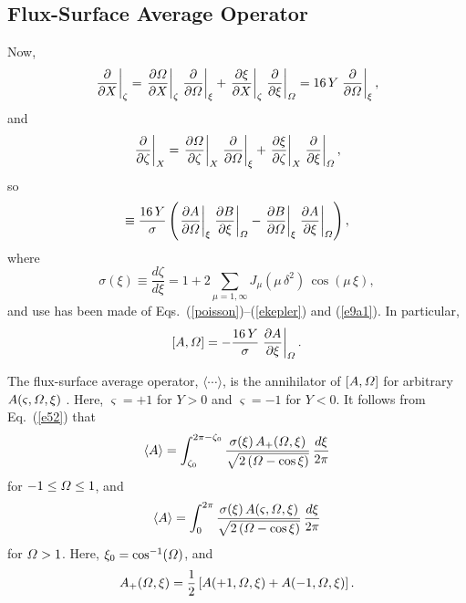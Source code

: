 \documentclass{iopjournal}
\begin{document}
\subsection{Flux-Surface Average Operator}
Now, 
\begin{equation}\label{e49}
\left.\frac{\partial}{\partial X}\right|_\zeta= \left.\frac{\partial{\mit\Omega}}{\partial X}\right|_\zeta\left.\frac{\partial}{\partial{\mit\Omega}}\right|_{\xi}+ \left.\frac{\partial\xi}{\partial X}\right|_\zeta\left.\frac{\partial}{\partial\xi}\right|_{\mit\Omega}=16\,Y\left.\frac{\partial}{\partial{\mit\Omega}}\right|_{\xi},
\end{equation}
and
\begin{equation}
\left.\frac{\partial}{\partial \zeta}\right|_X= \left.\frac{\partial{\mit\Omega}}{\partial \zeta}\right|_X\left.\frac{\partial}{\partial{\mit\Omega}}\right|_{\xi}+ \left.\frac{\partial\xi}{\partial \zeta}\right|_X\left.\frac{\partial}{\partial\xi}\right|_{\mit\Omega},
\end{equation}
so
\begin{equation}
[A,B] \equiv \frac{16\,Y}{\sigma}\left(\left.\frac{\partial A}{\partial{\mit\Omega}}\right|_\xi\left.\frac{\partial B}{\partial\xi}\right|_{\mit\Omega}-\left.\frac{\partial B}{\partial{\mit\Omega}}\right|_\xi\left.\frac{\partial A}{\partial\xi}\right|_{\mit\Omega}\right),
\end{equation}
where
\begin{equation}\label{sigma}
\sigma(\xi) \equiv\frac{d\zeta}{d\xi}=  1+2\sum_{\mu=1,\infty} J_\mu(\mu\,\delta^2)\,\cos(\mu\,\xi),
\end{equation}
and use has been made of Eqs.~(\ref{poisson})--(\ref{ekepler}) and (\ref{e9a1}). 
In particular,
\begin{equation}\label{e52}
[A,{\mit\Omega}] = -\frac{16\,Y}{\sigma}\left.\frac{\partial A}{\partial\xi}\right|_{\mit\Omega}.
\end{equation}

The flux-surface average operator, $\langle\cdots\rangle$, is the annihilator of $[A,{\mit\Omega}]$ for arbitrary $A(\varsigma,{\mit\Omega},\xi)$ \cite{ntm2,island}. Here, $\varsigma=+1$ for $Y>0$ and $\varsigma =-1$ for
$Y<0$. It follows from Eq.~(\ref{e52}) that
\begin{equation}
\langle A\rangle = \int_{\zeta_0}^{2\pi-\zeta_0}\frac{\sigma(\xi)\,A_+({\mit\Omega},\xi)}{\sqrt{2\,({\mit\Omega}-\cos\xi)}}\,\frac{d\xi}{2\pi}
\end{equation}
for $-1\leq {\mit\Omega}\leq 1$, and
\begin{equation}\label{e55}
\langle A\rangle = \int_0^{2\pi}\frac{\sigma(\xi)\,A(\varsigma,{\mit\Omega},\xi)}{\sqrt{2\,({\mit\Omega}-\cos\xi)}}\,\frac{d\xi}{2\pi}
\end{equation}
for ${\mit\Omega}>1$. Here, $\xi_0=\cos^{-1}({\mit\Omega})$, and
\begin{equation}
A_+({\mit\Omega},\xi)= \frac{1}{2}\left[A(+1,{\mit\Omega},\xi) + A(-1,{\mit\Omega},\xi)\right].
\end{equation}
\end{document}
